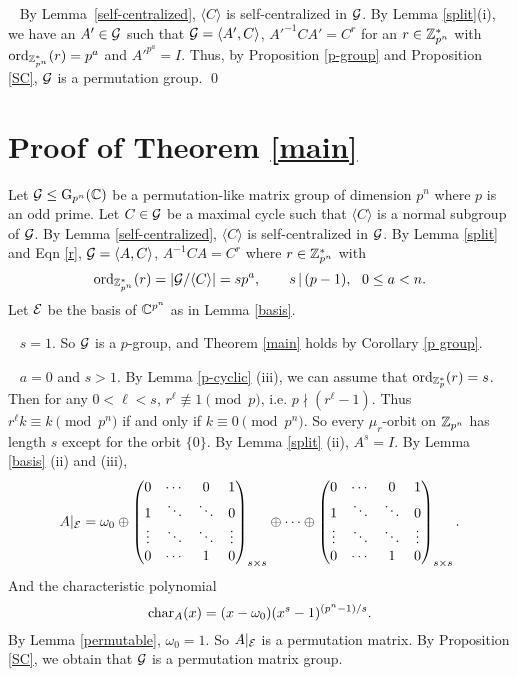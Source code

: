 \documentclass{article}
\numberwithin{equation}{section}
\def\pf{\noindent{\bf Proof.}~}
\begin{document}
\pf 
By Lemma~\ref{self-centralized}, $\langle C\rangle$ is self-centralized in ${\cal G}$.
By Lemma \ref{split}(i), we have an $A'\in{\cal G}$ such that
${\cal G}=\langle A',C\rangle$, $A'^{-1}CA'=C^r$ for an $r\in{\Bbb Z}_{p^n}^*$
with ${\rm ord}_{{\Bbb Z}_{p^n}^*}(r)=p^a$ and $A'^{p^a}=I$.
Thus, by Proposition \ref{p-group} and Proposition \ref{SC},
${\cal G}$ is a permutation group. \qed



\section{Proof of Theorem \ref{main}} \label{proof}


Let ${\cal G}\le{\rm G}_{p^n}({\Bbb C})$
be a permutation-like matrix group of dimension $p^n$
where $p$ is an odd prime. Let $C\in{\cal G}$ be a maximal cycle
such that $\langle C\rangle$ is a normal  subgroup of ${\cal G}$.
By Lemma \ref{self-centralized}, $\langle C\rangle$ is self-centralized in ${\cal G}$.
By Lemma \ref{split} and Eqn \eqref{r}, ${\cal G}=\langle A,C\rangle$,
$A^{-1}CA=C^r$ where $r\in{\Bbb Z}_{p^n}^*$ with
$$
{\rm ord}_{{\Bbb Z}_{p^n}^*}(r)=|{\cal G}/\langle C\rangle|=sp^a,\qquad
 s\,|\,(p-1),~~0\le a<n.
$$
Let ${\cal E}$ be the basis of ${\Bbb C}^{p^n}$ as in Lemma \ref{basis}.


~ $s=1$. So ${\cal G}$ is a $p$-group, and
Theorem \ref{main} holds by Corollary \ref{p group}.

~ $a=0$ and $s>1$.
By Lemma \ref{p-cyclic} (iii), we can assume that
${\rm ord}_{{\Bbb Z}_{p}^*}(r)=s$.
Then for any $0<\ell<s$, $r^\ell\not\equiv 1\pmod{p}$,
i.e. $p\nmid(r^\ell-1)$.
Thus $r^\ell k\equiv k\pmod{p^n}$ if and only if $k\equiv 0\pmod{p^n}$.
So every $\mu_r$-orbit on ${\Bbb Z}_{p^n}$ has length $s$ except for
the orbit $\{0\}$. By Lemma \ref{split} (ii), $A^s=I$.
By Lemma \ref{basis} (ii) and (iii),
$$
A|_{\cal E}=\omega_0\oplus
\begin{pmatrix}0&\cdots&0&1\\ 1&\ddots&\ddots&0\\
    \vdots&\ddots&\ddots&\vdots\\ 0&\cdots&1&0\end{pmatrix}_{s\times s}
\oplus\cdots\oplus
\begin{pmatrix}0&\cdots&0&1\\ 1&\ddots&\ddots&0\\
    \vdots&\ddots&\ddots&\vdots\\ 0&\cdots&1&0\end{pmatrix}_{s\times s}.
$$
And the characteristic polynomial
$${\rm char}_A(x)=(x-\omega_0)(x^s-1)^{(p^n-1)/s}.$$
By Lemma \ref{permutable}, $\omega_0=1$.
So $A|_{\cal E}$ is a permutation matrix.
By Proposition \ref{SC}, we obtain that ${\cal G}$ is a permutation matrix group.
\end{document}
